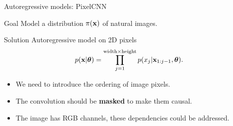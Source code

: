 \begin{frame}{Autoregressive models: PixelCNN}
	\begin{block}{Goal}
		Model a distribution $\pi(\mathbf{x})$ of natural images.
	\end{block}
	\begin{block}{Solution}
		Autoregressive model on 2D pixels
		\[
		    p(\mathbf{x} | \boldsymbol{\theta}) = \prod_{j=1}^{\text{width} \times \text{height}} p(x_j|\mathbf{x}_{1:j-1}, \boldsymbol{\theta}).
		\]
		\begin{itemize}
			\item We need to introduce the ordering of image pixels.
		    \item The convolution should be \textbf{masked} to make them causal.
		    \item The image has RGB channels, these dependencies could be addressed.
		\end{itemize}
	\end{block}
\end{frame}
